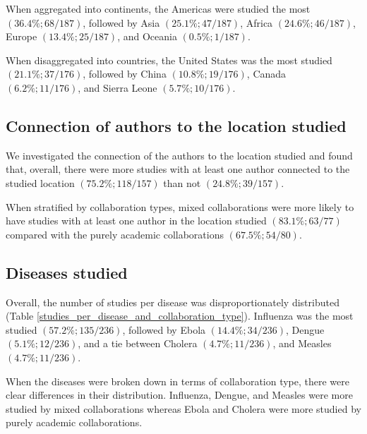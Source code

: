 \documentclass[10pt,letterpaper]{article}
\begin{document}
When aggregated into continents, the Americas were studied the most $(36.4\%; 68/187)$, followed by Asia $(25.1\%;47/187)$, Africa $(24.6\%; 46/187)$, Europe $(13.4\%; 25/187)$, and Oceania $(0.5\%; 1/187)$.

When disaggregated into countries, the United States was the most studied $(21.1\%; 37/176)$, followed by China $(10.8\%; 19/176)$, Canada $(6.2\%; 11/176)$, and Sierra Leone $(5.7\%; 10/176)$.

\subsection*{Connection of authors to the location studied}
We investigated the connection of the authors to the location studied and found that, overall, there were more studies with at least one author connected to the studied location $(75.2\%; 118/157)$ than not $(24.8\%; 39/157)$. 

When stratified by collaboration types, mixed collaborations were more likely to have studies with at least one author in the location studied $(83.1\%; 63/77)$ compared with the purely academic collaborations $(67.5\%; 54/80)$. 

\subsection*{Diseases studied}
Overall, the number of studies per disease was disproportionately distributed (Table \ref{studies_per_disease_and_collaboration_type}). Influenza was the most studied $(57.2\%; 135/236)$, followed by Ebola $(14.4\%; 34/236)$, Dengue $(5.1\%; 12/236)$, and a tie between Cholera $(4.7\%; 11/236)$, and Measles $(4.7\%; 11/236)$. 

When the diseases were broken down in terms of collaboration type, there were clear differences in their distribution. Influenza, Dengue, and Measles were more studied by mixed collaborations whereas Ebola and Cholera were more studied by purely academic collaborations. 
\end{document}

